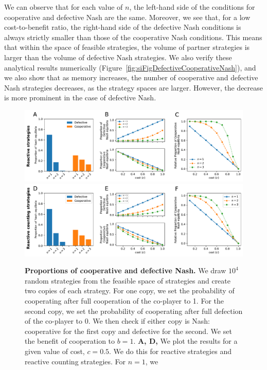 \documentclass[11pt]{article}
\theoremstyle{plainCl1}
\theoremstyle{plainCl2}
\begin{document}
\noindent
We can observe that for each value of \(n\), the left-hand side of the
conditions for cooperative and defective Nash are the same. Moreover, we see
that, for a low cost-to-benefit ratio, the right-hand side of the defective Nash
conditions is always strictly smaller than those of the cooperative Nash
conditions. This means that within the space of feasible strategies, the volume
of partner strategies is larger than the volume of defective Nash strategies. We
also verify these analytical results numerically
(Figure~\ref{fig:siFigDefectiveCooperativeNash}), and we also show that as memory increases,
the number of cooperative and defective Nash strategies decreases, as the
strategy spaces are larger. However, the decrease is more prominent in the case
of defective Nash.

\begin{figure}[h]
  \centering
  \includegraphics[width=\textwidth]{../../figures/siFig1.pdf}
  \includegraphics[width=\textwidth]{../../figures/siFig1Counting.pdf}
  \caption{
  \textbf{Proportions of cooperative and defective Nash.}
We draw \(10^4\) random strategies from the feasible space of strategies and
create two copies of each strategy. For one copy, we set the probability of
cooperating after full cooperation of the co-player to 1. For the second copy,
we set the probability of cooperating after full defection of the co-player to
0. We then check if either copy is Nash: cooperative for the first copy and
defective for the second. We set the benefit of cooperation to \(b = 1\).
{\bf A, D,} We plot the results for a given value of cost, \(c = 0.5\). We do
this for reactive strategies and reactive counting strategies. For \(n=1\), we
}
\end{figure}
\end{document}

